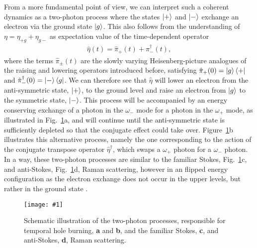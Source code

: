 \documentclass[reprint,secnumarabic,amssymb, nobibnotes, aip, prd]{revtex4-1}
\def\P{\hat{\pi}_+}
\def\M{\hat{\pi}_-}
\newcommand{\includegraphicsXL}[1]{\texttt{[image: \#1]}}
\begin{document}
From a more fundamental point of view, we can interpret such a coherent dynamics as a two-photon process where the states $\ket{+}$ and $\ket{-}$ exchange an electron via the ground state $\ket{g}$. This also follows from the understanding of $\eta = \eta_{+g}+\eta_{g-}$ as expectation value of the time-dependent operator \cite{loudon2000quantum}
\begin{align}
\hat\eta(t) = \P(t) +\M^{\dagger}(t),
\end{align}
where the terms $\hat\pi_{\pm}(t)$ are the slowly varying Heisenberg-picture analogues of the raising and lowering operators introduced before, satisfying $\P(0) =\ket{g}\bra{+}$ and $\M^{\dagger}(0)=\ket{-}\bra{g}$. We can therefore see that $\hat\eta$ will lower an electron from the anti-symmetric state, $\ket{+}$, to the ground level and raise an electron from $\ket{g}$ to the symmetric state, $\ket{-}$. This process will be accompanied by an energy conserving exchange of a photon in the $\omega_{-}$ mode for a photon in the $\omega_{+}$ mode, as illustrated in Fig.~\ref{fig:two_photon_process}a, and will continue until the anti-symmetric state is sufficiently depleted so that the conjugate effect could take over. Figure~\ref{fig:two_photon_process}b illustrates this alternative process, namely the one corresponding to the action of the conjugate transpose operator $\hat{\eta}^{\dagger}$, which swaps a $\omega_+$ photon for a $\omega_-$ photon. In a way, these two-photon processes are similar to the familiar Stokes, Fig.~\ref{fig:two_photon_process}c, and anti-Stokes, Fig.~\ref{fig:two_photon_process}d, Raman scattering, however in an flipped energy configuration as the electron exchange does not occur in the upper levels, but rather in the ground state \cite{butcher1991elements}. 
\begin{figure}[h!]
	\begin{center}
		\includegraphicsXL{IMGS/two_photon_process2.eps}
		\caption{Schematic illustration of the two-photon processes, responsible for temporal hole burning, \textbf{a} and \textbf{b}, and the familiar Stokes, \textbf{c}, and anti-Stokes, \textbf{d}, Raman scattering.} \label{fig:two_photon_process}
	\end{center}	
\end{figure}
\end{document}

